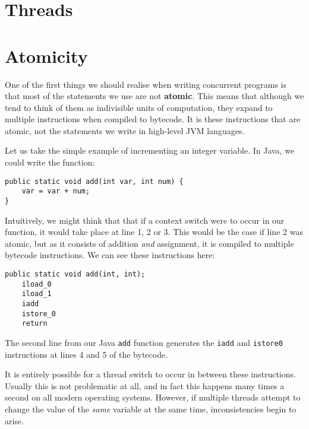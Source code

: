 \documentclass[a4paper,12pt]{kth-mag}
\begin{document}
\section{Threads}

\section{Atomicity}

One of the first things we should realise when writing concurrent programs is that most of the statements we use are not \textbf{atomic}. This means that although we tend to think of them as indivisible units of computation, they expand to multiple instructions when compiled to bytecode. It is these instructions that are atomic, not the statements we write in high-level JVM languages.

Let us take the simple example of incrementing an integer variable. In Java, we could write the function:

\begin{listing}[H]
\begin{verbatim}
public static void add(int var, int num) { 
	var = var + num; 
}
\end{verbatim}
\end{listing}

Intuitively, we might think that that if a context switch were to occur in our function, it would take place at line 1, 2 or 3. This would be the case if line 2 was atomic, but as it consists of addition \textit{and} assignment, it is compiled to multiple bytecode instructions. We can see these instructions here:

\begin{listing}[H]
	\begin{verbatim}
public static void add(int, int);
	iload_0
	iload_1
	iadd
	istore_0
	return
  	\end{verbatim}
\end{listing}

The second line from our Java \texttt{add} function generates the \texttt{iadd} and \texttt{istore0} instructions at lines 4 and 5 of the bytecode. 

It is entirely possible for a thread switch to occur in between these instructions. Usually this is not problematic at all, and in fact this happens many times a second on all modern operating systems. However, if multiple threads attempt to change the value of the \textit{same} variable at the same time, inconsistencies begin to arise. 
\end{document}
